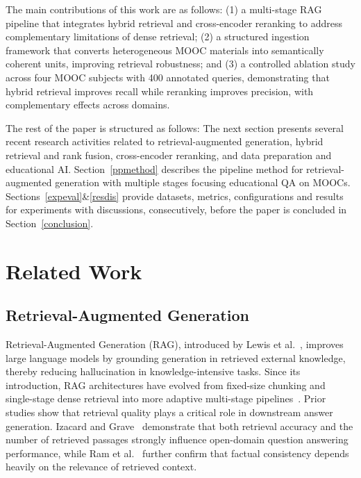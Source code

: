 \documentclass[runningheads]{llncs}
\begin{document}
The main contributions of this work are as follows: (1) a multi-stage RAG pipeline that integrates hybrid retrieval and cross-encoder reranking to address complementary limitations of dense retrieval; (2) a structured ingestion framework that converts heterogeneous MOOC materials into semantically coherent units, improving retrieval robustness; and (3) a controlled ablation study across four MOOC subjects with 400 annotated queries, demonstrating that hybrid retrieval improves recall while reranking improves precision, with complementary effects across domains.

The rest of the paper is structured as follows: The next section presents several recent research activities related to retrieval-augmented generation, hybrid retrieval and rank fusion, cross-encoder reranking, and data preparation and educational AI. Section~\ref{ppmethod} describes the pipeline method for retrieval-augmented generation with multiple stages focusing educational QA on MOOCs. Sections~\ref{expeval}\&\ref{resdis} provide datasets, metrics, configurations and results for experiments with discussions, consecutively, before the paper is concluded in Section~\ref{conclusion}.
\section{Related Work}

\subsection{Retrieval-Augmented Generation}

Retrieval-Augmented Generation (RAG), introduced by Lewis et al.~\cite{lewis2020rag}, improves large language models by grounding generation in retrieved external knowledge, thereby reducing hallucination in knowledge-intensive tasks. Since its introduction, RAG architectures have evolved from fixed-size chunking and single-stage dense retrieval into more adaptive multi-stage pipelines~\cite{gao2023survey,guu2020realm}. Prior studies show that retrieval quality plays a critical role in downstream answer generation. Izacard and Grave~\cite{izacard2021leveraging} demonstrate that both retrieval accuracy and the number of retrieved passages strongly influence open-domain question answering performance, while Ram et al.~\cite{ram2023incontext} further confirm that factual consistency depends heavily on the relevance of retrieved context.
\end{document}
